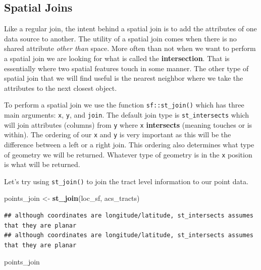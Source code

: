 \documentclass[
]{book}
\newenvironment{Shaded}{\begin{snugshade}}{\end{snugshade}}
\newcommand{\KeywordTok}[1]{\textcolor[rgb]{0.13,0.29,0.53}{\textbf{#1}}}
\newcommand{\NormalTok}[1]{#1}
\newcommand{\StringTok}[1]{\textcolor[rgb]{0.31,0.60,0.02}{#1}}
\begin{document}
\hypertarget{spatial-joins}{%
\subsection{Spatial Joins}\label{spatial-joins}}

Like a regular join, the intent behind a spatial join is to add the attributes of one data source to another. The utility of a spatial join comes when there is no shared attribute \emph{other than} space. More often than not when we want to perform a spatial join we are looking for what is called the \textbf{intersection}. That is essentially where two spatial features touch in some manner. The other type of spatial join that we will find useful is the nearest neighbor where we take the attributes to the next closest object.

To perform a spatial join we use the function \texttt{sf::st\_join()} which has three main arguments: \texttt{x}, \texttt{y}, and \texttt{join}. The default join type is \texttt{st\_intersects} which will join attributes (columns) from \texttt{y} where \texttt{x} \textbf{intersects} (meaning touches or is within). The ordering of our \texttt{x} and \texttt{y} is very important as this will be the difference between a left or a right join. This ordering also determines what type of geometry we will be returned. Whatever type of geometry is in the \texttt{x} position is what will be returned.

Let's try using \texttt{st\_join()} to join the tract level information to our point data.

\begin{Shaded}
\begin{Highlighting}[]
\NormalTok{points\_join \textless{}{-}}\StringTok{ }\KeywordTok{st\_join}\NormalTok{(loc\_sf, acs\_tracts) }
\end{Highlighting}
\end{Shaded}

\begin{verbatim}
## although coordinates are longitude/latitude, st_intersects assumes that they are planar
## although coordinates are longitude/latitude, st_intersects assumes that they are planar
\end{verbatim}

\begin{Shaded}
\begin{Highlighting}[]
\NormalTok{points\_join}
\end{Highlighting}
\end{Shaded}
\end{document}
